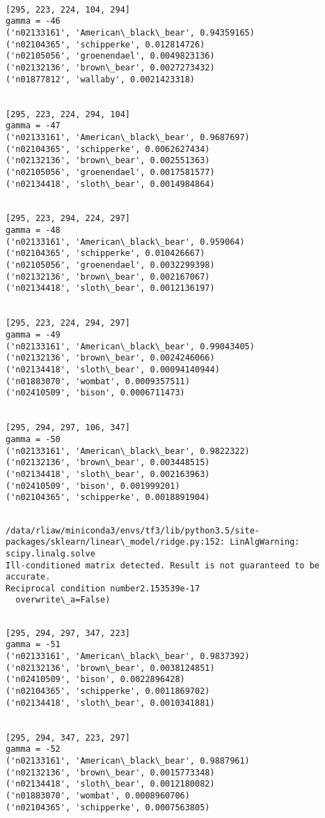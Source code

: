 \documentclass[11pt]{article}
\begin{document}
    \begin{Verbatim}[commandchars=\\\{\}]

[295, 223, 224, 104, 294]
gamma = -46
('n02133161', 'American\_black\_bear', 0.94359165)
('n02104365', 'schipperke', 0.012814726)
('n02105056', 'groenendael', 0.0049823136)
('n02132136', 'brown\_bear', 0.0027273432)
('n01877812', 'wallaby', 0.0021423318)


[295, 223, 224, 294, 104]
gamma = -47
('n02133161', 'American\_black\_bear', 0.9687697)
('n02104365', 'schipperke', 0.0062627434)
('n02132136', 'brown\_bear', 0.002551363)
('n02105056', 'groenendael', 0.0017581577)
('n02134418', 'sloth\_bear', 0.0014984864)


[295, 223, 294, 224, 297]
gamma = -48
('n02133161', 'American\_black\_bear', 0.959064)
('n02104365', 'schipperke', 0.010426667)
('n02105056', 'groenendael', 0.0032299398)
('n02132136', 'brown\_bear', 0.002167067)
('n02134418', 'sloth\_bear', 0.0012136197)


[295, 223, 224, 294, 297]
gamma = -49
('n02133161', 'American\_black\_bear', 0.99043405)
('n02132136', 'brown\_bear', 0.0024246066)
('n02134418', 'sloth\_bear', 0.00094140944)
('n01883070', 'wombat', 0.0009357511)
('n02410509', 'bison', 0.0006711473)


[295, 294, 297, 106, 347]
gamma = -50
('n02133161', 'American\_black\_bear', 0.9822322)
('n02132136', 'brown\_bear', 0.003448515)
('n02134418', 'sloth\_bear', 0.002163963)
('n02410509', 'bison', 0.001999201)
('n02104365', 'schipperke', 0.0018891904)


    \end{Verbatim}

    \begin{Verbatim}[commandchars=\\\{\}]
/data/rliaw/miniconda3/envs/tf3/lib/python3.5/site-packages/sklearn/linear\_model/ridge.py:152: LinAlgWarning: scipy.linalg.solve
Ill-conditioned matrix detected. Result is not guaranteed to be accurate.
Reciprocal condition number2.153539e-17
  overwrite\_a=False)

    \end{Verbatim}

    \begin{Verbatim}[commandchars=\\\{\}]

[295, 294, 297, 347, 223]
gamma = -51
('n02133161', 'American\_black\_bear', 0.9837392)
('n02132136', 'brown\_bear', 0.0038124851)
('n02410509', 'bison', 0.0022896428)
('n02104365', 'schipperke', 0.0011869702)
('n02134418', 'sloth\_bear', 0.0010341881)


[295, 294, 347, 223, 297]
gamma = -52
('n02133161', 'American\_black\_bear', 0.9887961)
('n02132136', 'brown\_bear', 0.0015773348)
('n02134418', 'sloth\_bear', 0.0012180082)
('n01883070', 'wombat', 0.0008960706)
('n02104365', 'schipperke', 0.0007563805)


    \end{Verbatim}
\end{document}
